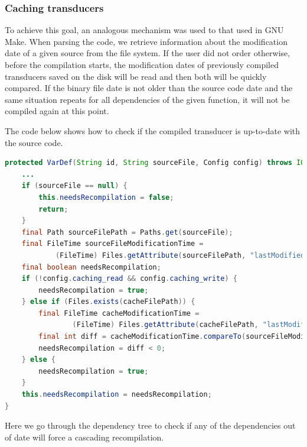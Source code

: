 \hypertarget{caching-transducers}{%
\subsubsection{Caching transducers}\label{caching-transducers}}

To achieve this goal, an analogous mechanism was used to that used in
GNU Make. When parsing the code, we retrieve information about the
modification date of a given source from the file system. If the user
did not order otherwise, before the compilation starts, the modification
dates of previously compiled transducers saved on the disk will be read
and then both will be quickly compared. If the binary file date is not
older than the source code date and the same situation repeats for all
dependencies of the given function, it will not be compiled again at
this point.

The code below shows how to check if the compiled transducer is
up-to-date with the source code.

\begin{lstlisting}[language=Java, frame=single]
protected VarDef(String id, String sourceFile, Config config) throws IOException {
    ...
    if (sourceFile == null) {
        this.needsRecompilation = false;
        return;
    }
    final Path sourceFilePath = Paths.get(sourceFile);
    final FileTime sourceFileModificationTime =
            (FileTime) Files.getAttribute(sourceFilePath, "lastModifiedTime");
    final boolean needsRecompilation;
    if (!config.caching_read && config.caching_write) {
        needsRecompilation = true;
    } else if (Files.exists(cacheFilePath)) {
        final FileTime cacheModificationTime =
                (FileTime) Files.getAttribute(cacheFilePath, "lastModifiedTime");
        final int diff = cacheModificationTime.compareTo(sourceFileModificationTime);
        needsRecompilation = diff < 0;
    } else {
        needsRecompilation = true;
    }
    this.needsRecompilation = needsRecompilation;
}
\end{lstlisting}

Here we go through the dependency tree to check if any of the
dependencies out of date will force a cascading recompilation. 


